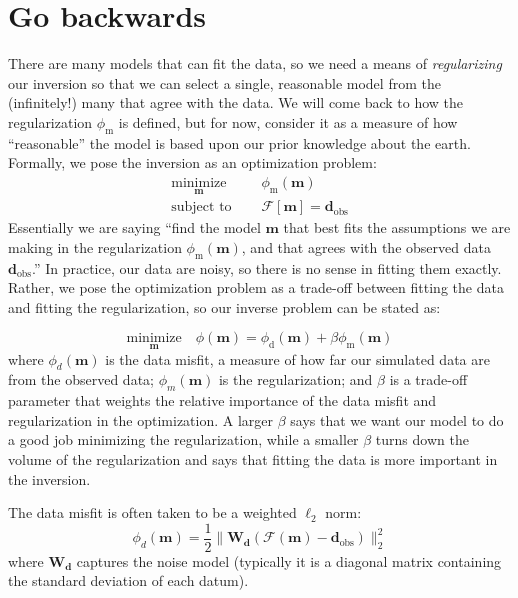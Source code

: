 \documentclass[11pt,oneside]{article}
\begin{document}
\section{Go backwards}

There are many models that can fit the data, so we need a means of \emph{regularizing} our inversion so that we can select a single, reasonable model from the (infinitely!) many that agree with the data. We will come back to how the regularization $\phi_{\text{m}}$ is defined, but for now, consider it as a measure of how ``reasonable'' the model is based upon our prior knowledge about the earth. Formally, we pose the inversion as an optimization problem:
\begin{equation}
\begin{split}
\underset{\mathbf{m}}{\text{minimize}} \quad &\phi_\text{m}(\mathbf{m}) \\
\text{subject to }\quad &\mathcal{F}[\mathbf{m}] = \mathbf{d}_{\text{obs}}
\end{split}
\end{equation}
Essentially we are saying ``find the model $\mathbf{m}$ that best fits the assumptions we are making in the regularization $\phi_\text{m}(\mathbf{m})$, and that agrees with the observed data $\mathbf{d}_{\text{obs}}$.'' In practice, our data are noisy, so there is no sense in fitting them exactly. Rather, we pose the optimization problem as a trade-off between fitting the data and fitting the regularization, so our inverse problem can be stated as:

\begin{equation}
\underset{\mathbf{m}}{\text{minimize}} \quad \phi(\mathbf{m}) = \phi_\mathrm{d}(\mathbf{m}) + \beta\phi_\mathrm{m}(\mathbf{m})
\end{equation}
where $\phi_d(\mathbf{m})$ is the data misfit, a measure of how far our simulated data are from the observed data; $\phi_m(\mathbf{m})$ is the regularization; and $\beta$ is a trade-off parameter that weights the relative importance of the data misfit and regularization in the optimization. A larger $\beta$ says that we want our model to do a good job minimizing the regularization, while a smaller $\beta$ turns down the volume of the regularization and says that fitting the data is more important in the inversion.

The data misfit is often taken to be a weighted $\ell_2$ norm:
\begin{equation}
\phi_d(\mathbf{m}) = \frac{1}{2}\|\mathbf{W_d} (\mathcal{F}(\mathbf{m}) - \mathbf{d}_{\text{obs}})\|^2_2
\end{equation}
where $\mathbf{W_d}$ captures the noise model (typically it is a diagonal matrix containing the standard deviation of each datum).
\end{document}
